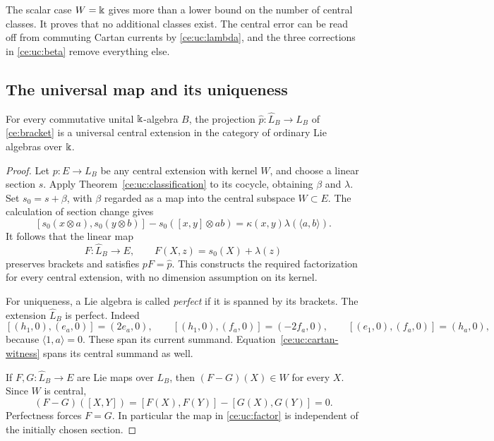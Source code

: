 The scalar case $W=\Bbbk$ gives more than a lower bound on the number of
central classes.  It proves that no additional classes exist.  The
central error can be read off from commuting Cartan currents by
\eqref{ce:uc:lambda}, and the three corrections in \eqref{ce:uc:beta} remove
everything else.

\subsection{The universal map and its uniqueness}
\label{ce:uc:universal-section}

\begin{theorem}
\label{ce:uc:universal}
For every commutative unital $\Bbbk$-algebra $B$, the projection
$\widehat p:\widehat L_B\to L_B$ of \eqref{ce:bracket} is
a universal central extension in the category of ordinary Lie algebras
over $\Bbbk$.
\end{theorem}

\begin{proof}
Let $p:E\to L_B$ be any central extension with kernel $W$, and choose
a linear section $s$.  Apply Theorem~\ref{ce:uc:classification} to its
cocycle, obtaining $\beta$ and $\lambda$.  Set $s_0=s+\beta$, with
$\beta$ regarded as a map into the central subspace $W\subset E$.
The calculation of section change gives
\[
 [s_0(x\otimes a),s_0(y\otimes b)]
 -s_0([x,y]\otimes ab)=\kappa(x,y)\lambda(\langle a,b\rangle).
\]
It follows that the linear map
\begin{equation}\label{ce:uc:factor}
 F:\widehat L_B\longrightarrow E,\qquad
 F(X,z)=s_0(X)+\lambda(z)
\end{equation}
preserves brackets and satisfies $pF=\widehat p$.  This constructs the
required factorization for every central extension, with no dimension
assumption on its kernel.

For uniqueness, a Lie algebra is called \emph{perfect} if it is spanned
by its brackets.  The extension $\widehat L_B$ is perfect.  Indeed
\[
 [(h_1,0),(e_a,0)]=(2e_a,0),\qquad
 [(h_1,0),(f_a,0)]=(-2f_a,0),\qquad
 [(e_1,0),(f_a,0)]=(h_a,0),
\]
because $\langle1,a\rangle=0$.  These span its current summand.
Equation~\eqref{ce:uc:cartan-witness} spans its central summand as well.

If $F,G:\widehat L_B\to E$ are Lie maps over $L_B$, then
$(F-G)(X)\in W$ for every $X$.  Since $W$ is central,
\[
 (F-G)([X,Y])=[F(X),F(Y)]-[G(X),G(Y)]=0.
\]
Perfectness forces $F=G$.  In particular the map in \eqref{ce:uc:factor}
is independent of the initially chosen section.
\end{proof}

